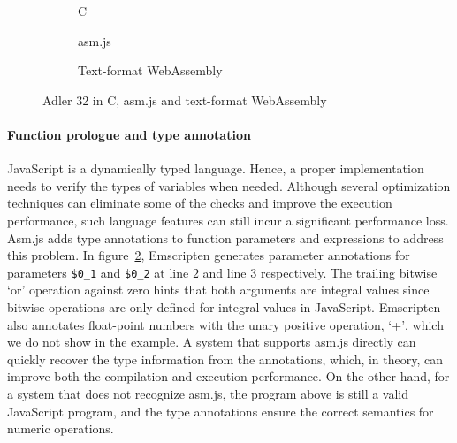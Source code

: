 \begin{figure}
  \centering
  \begin{subfigure}{\textwidth}
    
    \caption{C}
    \label{fig:adler-32-c}
  \end{subfigure}
  \begin{subfigure}{\textwidth}
    
    \caption{asm.js}
    \label{fig:adler-32-asmjs}
  \end{subfigure}
  \begin{subfigure}{\textwidth}
    
    \caption{Text-format WebAssembly}
    \label{fig:adler-32-webassembly}
  \end{subfigure}
  \caption{Adler 32 in C, asm.js and text-format WebAssembly}
  \label{fig:adler-32}
\end{figure}

\paragraph{Function prologue and type annotation}
JavaScript is a dynamically typed language. Hence, a proper implementation needs
to verify the types of variables when needed. Although several optimization
techniques can eliminate some of the checks and improve the execution
performance, such language features can still incur a significant performance
loss. Asm.js adds type annotations to function parameters and expressions to
address this problem. In figure~\ref{fig:adler-32-asmjs}, Emscripten generates
parameter annotations for parameters \texttt{\$0\_1} and \texttt{\$0\_2} at
line $2$ and line $3$ respectively. The trailing bitwise `or' operation against
zero hints that both arguments are integral values since bitwise operations are
only defined for integral values in JavaScript. Emscripten also annotates
float-point numbers with the unary positive operation, `+', which we do not show
in the example. A system that supports asm.js directly can quickly recover the
type information from the annotations, which, in theory, can improve both the
compilation and execution performance. On the other hand, for a system that does
not recognize asm.js, the program above is still a valid JavaScript program, and
the type annotations ensure the correct semantics for numeric operations.

